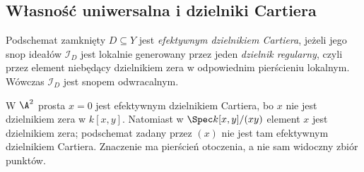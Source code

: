 \subsection{Własność uniwersalna i dzielniki Cartiera}

\begin{definicja}
\label{def:ga5-cartier}
Podschemat zamknięty $D\subseteq Y$ jest \emph{efektywnym
dzielnikiem Cartiera}, jeżeli jego snop ideałów
$\mathcal I_D$ jest lokalnie generowany przez jeden
\emph{dzielnik regularny}, czyli przez element niebędący
dzielnikiem zera w odpowiednim pierścieniu lokalnym.
Wówczas $\mathcal I_D$ jest snopem odwracalnym.
\end{definicja}

\begin{przyklad}
W $\A^2$ prosta $x=0$ jest efektywnym dzielnikiem Cartiera,
bo $x$ nie jest dzielnikiem zera w $k[x,y]$.
Natomiast w $\Spec k[x,y]/(xy)$ element $x$ jest dzielnikiem
zera; podschemat zadany przez $(x)$ nie jest tam efektywnym
dzielnikiem Cartiera. Znaczenie ma pierścień otoczenia,
a nie sam widoczny zbiór punktów.
\end{przyklad}

